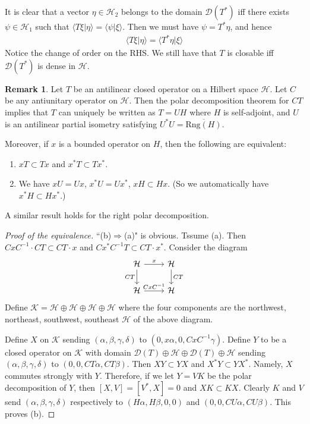 \documentclass[12pt,b5paper,notitlepage]{article}
\theoremstyle{definition}
\newtheorem{rem}[df]{Remark}
\theoremstyle{plain}
\newcommand{\mc}{\mathcal}
\newcommand{\ovl}{\overline}
\newcommand{\Dom}{\scr{D}}
\newcommand{\bk}[1]{\langle {#1}\rangle}
\newcommand{\scr}{\mathscr}
\newcommand{\Rng}{\mathrm{Rng}}
\numberwithin{equation}{section}
\begin{document}
It is clear that a vector $\eta\in\mc H_2$ belongs to the domain $\Dom(T^*)$ iff there exists $\psi\in\mc H_1$ such that $\bk{T\xi|\eta}=\bk{\psi|\xi}$. Then we must have $\psi=T^*\eta$, and hence
\begin{align}
\bk{T\xi|\eta}=\bk{T^*\eta|\xi}
\end{align}
Notice the change of order on the RHS. We still have that $T$ is closable iff $\Dom(T^*)$ is dense in $\mc H$.  \hfill\qedsymbol


\begin{rem}\label{lba20}
Let $T$ be an antilinear closed operator on a Hilbert space $\mc H$. Let $C$ be any antiunitary operator on $\mc H$. Then the polar decomposition theorem for $CT$ implies that $T$ can uniquely be written as $T=UH$ where $H$ is self-adjoint, and $U$ is an antilinear partial isometry satisfying $U^*U=\ovl{\Rng(H)}$. 

Moreover, if $x$ is a bounded operator on $H$, then the following are equivalent:
\begin{enumerate}[label=(\alph*)]
\item $xT\subset Tx$ and $x^*T\subset Tx^*$.
\item We have $xU=Ux$, $x^*U=Ux^*$, $xH\subset Hx$. (So we automatically have $x^*H\subset Hx^*$.)
\end{enumerate}
\end{rem}

A similar result holds for the right polar decomposition.

\begin{proof}[Proof of the equivalence]
``(b)$\Rightarrow$(a)" is obvious. Tssume (a). Then $CxC^{-1}\cdot CT\subset CT\cdot x$ and $Cx^*C^{-1}T\subset CT\cdot x^*$. Consider the diagram
\begin{equation*}
\begin{tikzcd}
\mc H \arrow[d, "CT"'] \arrow[r, "x"] & \mc H \arrow[d, "CT"] \\
\mc H \arrow[r, "CxC^{-1}"]           & \mc H                
\end{tikzcd}
\end{equation*}
Define $\mc K=\mc H\oplus\mc H\oplus\mc H\oplus\mc H$ where the four components are the northwest, northeast, southwest, southeast $\mc H$ of the above diagram.

Define $X$ on $\mc K$ sending $(\alpha,\beta,\gamma,\delta)$ to $(0,x\alpha,0,CxC^{-1}\gamma)$. Define $Y$ to be a closed operator on $\mc K$ with domain $\Dom(T)\oplus\mc H\oplus\Dom(T)\oplus\mc H$ sending  $(\alpha,\beta,\gamma,\delta)$ to $(0,0,CT\alpha,CT\beta)$. Then $XY\subset YX$ and $X^*Y\subset YX^*$. Namely, $X$ commutes strongly with $Y$. Therefore, if we let $Y=VK$ be the polar decomposition of $Y$, then $[X,V]=[V^*,X]=0$ and $XK\subset KX$. Clearly $K$ and $V$ send $(\alpha,\beta,\gamma,\delta)$ respectively to $(H\alpha,H\beta,0,0)$ and $(0,0,CU\alpha,CU\beta)$. This proves (b).
\end{proof}
\end{document}
